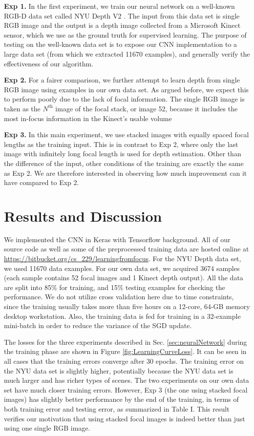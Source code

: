 \documentclass[letterpaper, 10 pt, conference]{ieeeconf}  %
\begin{document}
\textbf{Exp 1.} In the first experiment, we train our neural network on a well-known RGB-D data set called NYU Depth V2 \cite{eigen2014depth}. The input from this data set is single RGB image and the output is a depth image collected from a Microsoft Kinect sensor, which we use as the ground truth for supervised learning. The purpose of testing on the well-known data set is to expose our CNN implementation to a large data set (from which we extracted 11670 examples), and generally verify the effectiveness of our algorithm. 

\textbf{Exp 2.} For a fairer comparison, we further attempt to learn depth from single RGB image using examples in our own data set. As argued before, we expect this to perform poorly due to the lack of focal information. The single RGB image is taken as the $N^{\mathrm{th}}$ image of the focal stack, or image 52, because it includes the most in-focus information in the Kinect's usable volume

\textbf{Exp 3.} In this main experiment, we use stacked images with equally spaced focal lengths as the training input. This is in contrast to Exp 2, where only the last image with infinitely long focal length is used for depth estimation. Other than the difference of the input, other conditions of the training are exactly the same as Exp 2. We are therefore interested in observing how much improvement can it have compared to Exp 2. 

\section{Results and Discussion}
\label{sec:results}
We implemented the CNN in Keras \cite{chollet2015keras} with Tensorflow \cite{abadi2016tensorflow} background. All of our source code as well as some of the preprocessed training data are hosted online at \url{https://bitbucket.org/cs_229/learningfromfocus}. For the NYU Depth data set, we used 11670 data examples. For our own data set, we acquired 3674 samples (each sample contains 52 focal images and 1 Kinect depth output). All the data are split into 85\% for training, and 15\% testing examples for checking the performance. We do not utilize cross validation here due to time constraints, since the training usually takes more than five hours on a 12-core, 64-GB memory desktop workstation. Also, the training data is fed for training in a 32-example mini-batch in order to reduce the variance of the SGD update. 

The losses for the three experiments described in Sec. \ref{sec:neuralNetwork} during the training phase are shown in Figure \ref{fig:LearningCurveLoss}. It can be seen in all cases that the training errors converge after 30 epochs. The training error on the NYU data set is slightly higher, potentially because the NYU data set is much larger and has richer types of scenes. The two experiments on our own data set have much closer training errors. However, Exp 3 (the one using stacked focal images) has slightly better performance by the end of the training, in terms of both training error and testing error, as summarized in Table I. This result verifies our motivation that using stacked focal images is indeed better than just using one single RGB image. 
\end{document}
